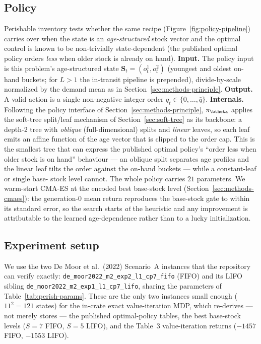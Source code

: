 \FloatBarrier

\subsection{Policy}
\label{sec:perishable-policy}

Perishable inventory tests whether the same recipe (Figure~\ref{fig:policy-pipeline}) carries over
when the state is an \emph{age-structured} stock vector and the optimal control is known to be
non-trivially state-dependent (the published optimal policy orders \emph{less} when older stock is
already on hand). \textbf{Input.} The policy input is this problem's age-structured state
$\mathbf S_t=(o^{1}_t,o^{2}_t)$ (youngest and oldest on-hand buckets; for $L>1$ the in-transit
pipeline is prepended), divide-by-scale normalized by the demand mean as in
Section~\ref{sec:methods-principle}. \textbf{Output.} A valid action is a single non-negative integer
order $q_t\in\{0,\dots,\bar q\}$. \textbf{Internals.} Following the policy interface of
Section~\ref{sec:methods-principle}, $\pi_{\btheta}$ applies the soft-tree split/leaf mechanism of
Section~\ref{sec:soft-tree} as its backbone: a depth-2 tree with \emph{oblique} (full-dimensional)
splits and \emph{linear} leaves, so each leaf emits an affine function of the age vector that is
clipped to the order cap. This is the smallest tree that can express the published optimal policy's
``order less when older stock is on hand'' behaviour --- an oblique split separates age profiles and
the linear leaf tilts the order against the on-hand buckets --- while a constant-leaf or single base-
stock level cannot. The whole policy carries $21$ parameters. We warm-start CMA-ES at the encoded
best base-stock level (Section~\ref{sec:methods-cmaes}): the generation-0 mean return reproduces the
base-stock gate to within its standard error, so the search starts \emph{at} the heuristic and any
improvement is attributable to the learned age-dependence rather than to a lucky initialization.

\subsection{Experiment setup}
\label{sec:perishable-setup}

We use the two De Moor et al.\ (2022) Scenario~A instances that the repository can verify exactly:
\texttt{de\_moor2022\_m2\_exp2\_l1\_cp7\_fifo} (FIFO) and its LIFO sibling
\texttt{de\_moor2022\_m2\_exp1\_l1\_cp7\_lifo}, sharing the parameters of
Table~\ref{tab:perish-params}. These are the only two instances small enough ($11^2=121$ states) for
the in-crate exact value-iteration MDP, which re-derives --- not merely stores --- the published
optimal-policy tables, the best base-stock levels ($S=7$ FIFO, $S=5$ LIFO), and the
\citet{farrington2025perishable} Table~3 value-iteration returns ($-1457$ FIFO, $-1553$ LIFO).

